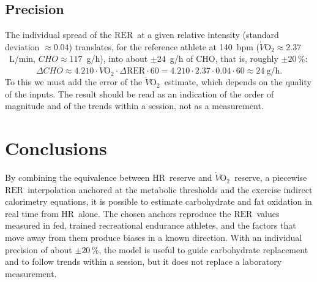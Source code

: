 \documentclass[10pt,a4paper]{article}
\newcommand{\VO}{\ensuremath{\dot V\mathrm{O_2}}}
\newcommand{\RER}{\ensuremath{\mathrm{RER}}}
\newcommand{\FC}{\ensuremath{\mathrm{HR}}}
\begin{document}
\subsection{Precision}
The individual spread of the \RER\ at a given relative intensity (standard deviation
$\approx0.04$) \citep{goedecke2000} translates, for the reference athlete at 140~bpm
($\VO\approx2.37$~L/min, $CHO\approx117$~g/h), into about $\pm24$~g/h of CHO, that is,
roughly $\pm20\,\%$:
\begin{equation}
  \Delta CHO\approx4.210\cdot\VO\cdot\Delta\RER\cdot60
  =4.210\cdot2.37\cdot0.04\cdot60\approx24~\mathrm{g/h}.
\end{equation}
To this we must add the error of the \VO\ estimate, which depends on the quality of the
inputs. The result should be read as an indication of the order of magnitude and of the
trends within a session, not as a measurement.

\section{Conclusions}

By combining the equivalence between \FC\ reserve and \VO\ reserve, a piecewise \RER\
interpolation anchored at the metabolic thresholds and the exercise indirect calorimetry
equations, it is possible to estimate carbohydrate and fat oxidation in real time from \FC\
alone. The chosen anchors reproduce the \RER\ values measured in fed, trained recreational
endurance athletes, and the factors that move away from them produce biases in a known
direction. With an individual precision of about $\pm20\,\%$, the model is useful to guide
carbohydrate replacement and to follow trends within a session, but it does not replace a
laboratory measurement.
\end{document}
